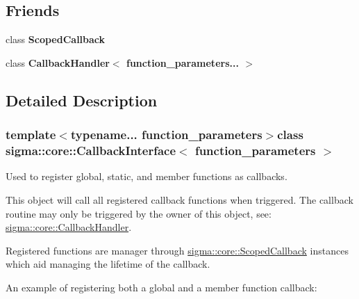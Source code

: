 \subsection*{Friends}
\begin{DoxyCompactItemize}
\item 
\hypertarget{classsigma_1_1core_1_1_callback_interface_a3414685dbc2eaa79d5e5af6729f74c0f}{}class {\bfseries Scoped\+Callback}\label{classsigma_1_1core_1_1_callback_interface_a3414685dbc2eaa79d5e5af6729f74c0f}

\item 
\hypertarget{classsigma_1_1core_1_1_callback_interface_aa40ef6fe1ae370543551561772e9d468}{}class {\bfseries Callback\+Handler$<$ function\+\_\+parameters... $>$}\label{classsigma_1_1core_1_1_callback_interface_aa40ef6fe1ae370543551561772e9d468}

\end{DoxyCompactItemize}


\subsection{Detailed Description}
\subsubsection*{template$<$typename... function\+\_\+parameters$>$class sigma\+::core\+::\+Callback\+Interface$<$ function\+\_\+parameters $>$}

Used to register global, static, and member functions as callbacks. 

This object will call all registered callback functions when triggered. The callback routine may only be triggered by the owner of this object, see\+: \hyperlink{classsigma_1_1core_1_1_callback_handler}{sigma\+::core\+::\+Callback\+Handler}.

Registered functions are manager through \hyperlink{classsigma_1_1core_1_1_scoped_callback}{sigma\+::core\+::\+Scoped\+Callback} instances which aid managing the lifetime of the callback.

An example of registering both a global and a member function callback\+:


